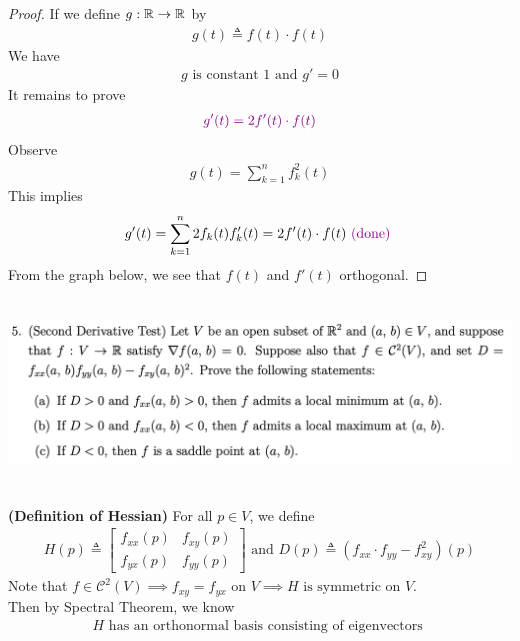 \documentclass{report}
\begin{document}
\begin{proof}
If we define $g:\mathbb{R}\rightarrow \mathbb{R}$ by  
\begin{align*}
g(t)\triangleq f(t)\cdot f(t)
\end{align*}
We have 
\begin{align*}
g\text{ is constant $1$ and }g'=0
\end{align*}
It remains to prove 
\begin{align*}
\textcolor{violet}{g'(t)=2f'(t)\cdot f(t)}
\end{align*}
Observe 
\begin{align*}
g(t)=\sum_{k=1}^n f_k^2(t)
\end{align*}
This implies 
\begin{align*}
g'(t)=\sum_{k=1}^n 2f_k(t) f'_k(t)=2f'(t)\cdot f(t)\textcolor{violet}{\text{ (done) }}
\end{align*}
From the graph below, we see that $f(t)$ and $f'(t)$ orthogonal.
\end{proof}
\begin{question}{}{}
\includegraphics[height=5cm,width=18cm]{hw6a5}
\end{question}
\begin{definition}
\textbf{(Definition of Hessian)} For all $p \in V$, we define 
\begin{align*}
H(p)\triangleq \begin{bmatrix}
  f_{xx}(p) & f_{xy}(p)\\
  f_{yx}(p) & f_{yy}(p)
\end{bmatrix}\text{ and }D(p)\triangleq (f_{xx} \cdot f_{yy} - f_{xy}^2)(p)
\end{align*}
Note that $f \in \mathcal{C}^2 (V)\implies f_{xy}=f_{yx}\text{ on }V \implies H\text{ is symmetric on }V$.\\

Then by Spectral Theorem, we know 
\begin{align*}
H\text{ has an orthonormal basis consisting of eigenvectors }
\end{align*}
\end{definition}
\end{document}
